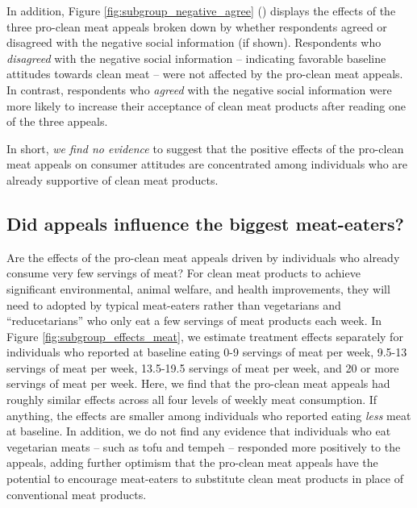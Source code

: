 \documentclass[12pt]{article}
\begin{document}

In addition, Figure \ref{fig:subgroup_negative_agree} () displays the effects of the three pro-clean meat appeals broken down by whether respondents agreed or disagreed with the negative social information (if shown). Respondents who \textit{disagreed} with the negative social information -- indicating favorable baseline attitudes towards clean meat -- were not affected by the pro-clean meat appeals. In contrast, respondents who \textit{agreed} with the negative social information were more likely to increase their acceptance of clean meat products after reading one of the three appeals.

In short, \textit{we find no evidence} to suggest that the positive effects of the pro-clean meat appeals on consumer attitudes are concentrated among individuals who are already supportive of clean meat products.


\subsection{Did appeals influence the biggest meat-eaters?} 

Are the effects of the pro-clean meat appeals driven by individuals who already consume very few servings of meat? For clean meat products to achieve significant environmental, animal welfare, and health improvements, they will need to adopted by typical meat-eaters rather than vegetarians and ``reducetarians'' who only eat a few servings of meat products each week. In Figure \ref{fig:subgroup_effects_meat}, we estimate treatment effects separately for individuals who reported at baseline eating 0-9 servings of meat per week, 9.5-13 servings of meat per week, 13.5-19.5 servings of meat per week, and 20 or more servings of meat per week. Here, we find that the pro-clean meat appeals had roughly similar effects across all four levels of weekly meat consumption. If anything, the effects are smaller among individuals who reported eating \textit{less} meat at baseline. In addition, we do not find any evidence that individuals who eat vegetarian meats -- such as tofu and tempeh -- responded more positively to the appeals, adding further optimism that the pro-clean meat appeals have the potential to encourage meat-eaters to substitute clean meat products in place of conventional meat products.
\end{document}
